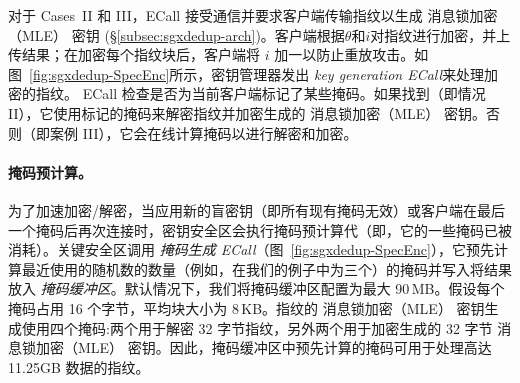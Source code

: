对于 Cases~II 和 III，ECall 接受通信并要求客户端传输指纹以生成 消息锁加密（MLE） 密钥 (\S\ref{subsec:sgxdedup-arch})。客户端根据$\theta$和$i$对指纹进行加密，并上​​传结果；在加密每个指纹块后，客户端将 $i$ 加一以防止重放攻击。如图~\ref{fig:sgxdedup-SpecEnc}所示，密钥管理器发出\textit{ key generation ECall}来处理加密的指纹。 ECall 检查是否为当前客户端标记了某些掩码。如果找到（即情况 II），它使用标记的掩码来解密指纹并加密生成的 消息锁加密（MLE） 密钥。否则（即案例 III），它会在线计算掩码以进行解密和加密。

\paragraph*{掩码预计算。} 为了加速加密/解密，当应用新的盲密钥（即所有现有掩码无效）或客户端在最后一个掩码后再次连接时，密钥安全区会执行掩码预计算代（即，它的一些掩码已被消耗）。关键安全区调用 \textit{ 掩码生成 ECall}（图~\ref{fig:sgxdedup-SpecEnc}），它预先计算最近使用的随机数的数量（例如，在我们的例子中为三个）的掩码并写入将结果放入 \textit{ 掩码缓冲区}。默认情况下，我们将掩码缓冲区配置为最大 90\,MB。假设每个掩码占用 16 个字节，平均块大小为 8\,KB。指纹的 消息锁加密（MLE） 密钥生成使用四个掩码:两个用于解密 32 字节指纹，另外两个用于加密生成的 32 字节 消息锁加密（MLE） 密钥。因此，掩码缓冲区中预先计算的掩码可用于处理高达 11.25GB 数据的指纹。
